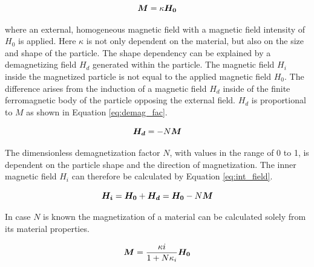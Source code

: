 \begin{equation}
\label{eq:kappa}
\centering
\boldsymbol{M} = \kappa\boldsymbol{H_{0}}
\end{equation}

where an external, homogeneous magnetic field with a magnetic field intensity of $H_{0}$ is applied. Here $\kappa$ is not only dependent on the material, but also on the size and shape of the particle. The shape dependency can be explained by a demagnetizing field $H_{d}$ generated within the particle. The magnetic field $H_{i}$ inside the magnetized particle is not equal to the applied magnetic field $H_{0}$. The difference arises from the induction of a magnetic field $H_{d}$ inside of the finite ferromagnetic body of the particle opposing the external field. $H_{d}$ is proportional to $M$ as shown in Equation \ref{eq:demag_fac}. 

\begin{equation}
\label{eq:demag_fac}
\centering
\boldsymbol{H_{d}} = -N\boldsymbol{M}
\end{equation}

The dimensionless demagnetization factor $N$, with values in the range of 0 to 1, is dependent on the particle shape and the direction of magnetization. The inner magnetic field $H_{i}$ can therefore be calculated by Equation \ref{eq:int_field}. 

\begin{equation}
\label{eq:int_field}
\centering
\boldsymbol{H_{i}} = \boldsymbol{H_{0}} + \boldsymbol{H_{d}} = \boldsymbol{H_{0}} - N\boldsymbol{M}
\end{equation}

In case $N$ is known the magnetization of a material can be calculated solely from its material properties. 

\begin{equation}
\label{eq:mag_demag_fac}
\centering
\boldsymbol{M} = \frac{\kappa{i}}{1+N\kappa_{i}}\boldsymbol{H_{0}}
\end{equation}

